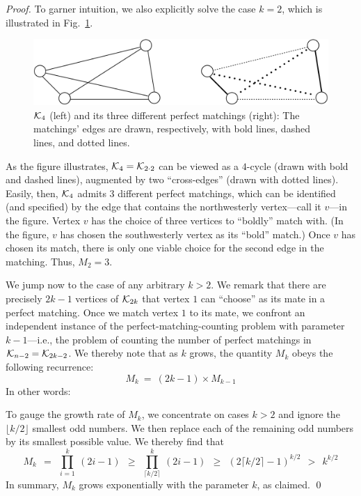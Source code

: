 \begin{proof}
To garner intuition, we also explicitly solve the case $k=2$, which is illustrated in Fig.~\ref{fig:AllPerfectMatchings}.
\begin{figure}[hbt]
\begin{center}
       \includegraphics[scale=0.55]{FiguresGraph/perfectmatchingAll}
       \caption{$\mbox{$\cal K$}_4$ (left) and its three different perfect matchings (right):  The matchings' edges are drawn, respectively, with bold lines, dashed lines, and dotted lines.}
  \label{fig:AllPerfectMatchings}
\end{center}
\end{figure}
As the figure illustrates, $\mbox{$\cal K$}_4 = \mbox{$\cal K$}_{2 \cdot 2}$ can be viewed as a $4$-cycle (drawn with bold and dashed lines), augmented by two ``cross-edges'' (drawn with dotted lines).  Easily, then, $\mbox{$\cal K$}_4$ admits $3$ different perfect matchings, which can be identified (and specified) by the edge that contains the northwesterly vertex---call it $v$---in the figure.  Vertex $v$ has the choice of three vertices to ``boldly'' match with. (In the figure, $v$ has chosen the southwesterly vertex as its ``bold'' match.)  Once $v$ has chosen its match, there is only one viable choice for the second edge in the matching.  Thus, $M_2=3$.

\medskip

We jump now to the case of any arbitrary $k > 2$.  We remark that there are precisely $2k-1$ vertices of $\mbox{$\cal K$}_{2k}$ that vertex $1$ can ``choose'' as its mate in a perfect matching.  Once we match vertex $1$ to its mate, we confront an independent instance of the perfect-matching-counting problem with parameter $k-1$---i.e., the problem of counting the number of perfect matchings in $\mbox{$\cal K$}_{n-2} = \mbox{$\cal K$}_{2k-2}$.  We thereby note that as $k$ grows, the quantity $M_k$ obeys the following recurrence:
\[ M_k \ = \ (2k-1) \times M_{k-1} \]
In other words:

\smallskip

\hspace*{.25in}{\em $M_k$ is the product of the first $k$ odd numbers.}

\smallskip

\noindent
To gauge the growth rate of $M_k$, we concentrate on cases $k > 2$ and ignore the $\lfloor k/2 \rfloor$ smallest odd numbers.  We then replace each of the remaining odd numbers by its smallest possible value.  We thereby find that
\[
M_k \ \ =    \ \ \prod_{i=1}^k \ (2i-1)
    \ \ \geq \ \ \prod_{\lceil k/2 \rceil}^k \ (2i-1)
    \ \ \geq \ \ \left( 2 \lceil k/2 \rceil -1 \right)^{k/2}
    \ \ >    \ \ k^{k/2}
\]
In summary, $M_k$ grows exponentially with the parameter $k$, as claimed.  \qed
\end{proof}

